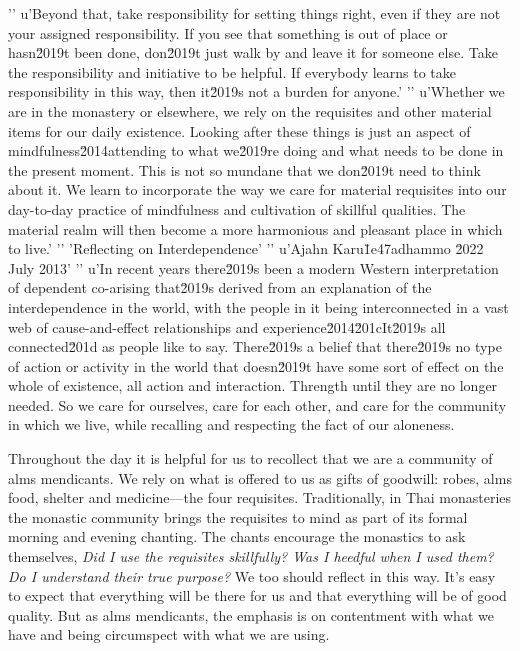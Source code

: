 '\n'
u'Beyond that, take responsibility for setting things right, even if they are not your assigned responsibility. If you see that something is out of place or hasn\u2019t been done, don\u2019t just walk by and leave it for someone else. Take the responsibility and initiative to be helpful. If everybody learns to take responsibility in this way, then it\u2019s not a burden for anyone.'
'\n'
u'Whether we are in the monastery or elsewhere, we rely on the requisites and other material items for our daily existence. Looking after these things is just an aspect of mindfulness\u2014attending to what we\u2019re doing and what needs to be done in the present moment. This is not so mundane that we don\u2019t need to think about it. We learn to incorporate the way we care for material requisites into our day-to-day practice of mindfulness and cultivation of skillful qualities. The material realm will then become a more harmonious and pleasant place in which to live.'
'\n'
'Reflecting on Interdependence'
'\n'
u'Ajahn Karu\u1e47adhammo \u2022 July 2013'
'\n'
u'In recent years there\u2019s been a modern Western interpretation of dependent co-arising that\u2019s derived from an explanation of the interdependence in the world, with the people in it being interconnected in a vast web of cause-and-effect relationships and experience\u2014\u201cIt\u2019s all connected\u201d as people like to say. There\u2019s a belief that there\u2019s no type of action or activity in the world that doesn\u2019t have some sort of effect on the whole of existence, all action and interaction. Thrength until they are no longer needed. 
So we care for ourselves, care for each other, and care for the 
community in which we live, while recalling and respecting the fact of 
our aloneness.


Throughout the day it is helpful for us to recollect that we are a 
community of alms mendicants. We rely on what is offered to us as gifts 
of goodwill: robes, alms food, shelter and medicine---the four 
requisites. Traditionally, in Thai monasteries the monastic community 
brings the requisites to mind as part of its formal morning and evening 
chanting. The chants encourage the monastics to ask themselves, 
\emph{Did I use the requisites skillfully? Was I heedful when I used 
them? Do I understand their true purpose?} We too should reflect in 
this way. It's easy to expect that everything will be there for us and 
that everything will be of good quality. But as alms mendicants, the 
emphasis is on contentment with what we have and being circumspect with 
what we are using.

